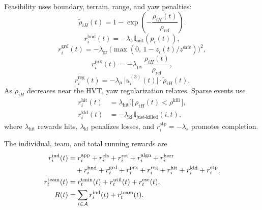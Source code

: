 \documentclass[unbranded]{cja}
\begin{document}
Feasibility uses boundary, terrain, range, and yaw penalties:
\begin{equation}
\widetilde\rho_{iH}(t)
=
1-
\exp\!\left(-\frac{\rho_{iH}(t)}{\rho_{\mathrm{ref}}}\right).
\end{equation}
\begin{equation}
r_i^{\mathrm{bnd}}(t)=-\lambda_b\,\mathbb{I}_{\mathrm{out}}(p_i(t)),
\label{eq:r-bnd}
\end{equation}
\begin{equation}
r_i^{\mathrm{grd}}(t)=-\lambda_{\mathrm{gr}}\,\bigl(\max(0,\,1-z_i(t)/z^{\mathrm{safe}})\bigr)^{2},
\label{eq:r-grd}
\end{equation}
\begin{equation}
r_i^{\mathrm{prx}}(t)=-\lambda_{\mathrm{px}}\,\frac{\rho_{iH}(t)}{\rho_{\mathrm{ref}}},
\label{eq:r-prx}
\end{equation}
\begin{equation}
r_i^{\mathrm{reg}}(t)=-\lambda_{\mu}\,\bigl|u_i^{(3)}(t)\bigr|\cdot \widetilde\rho_{iH}(t).
\label{eq:r-reg}
\end{equation}
As $\widetilde\rho_{iH}$ decreases near the HVT, yaw regularization relaxes. Sparse events use
\begin{equation}
\begin{aligned}
r_i^{\mathrm{hit}}(t)
&=\lambda_{\mathrm{hit}}\mathbb{I}\bigl[\,\rho_{iH}(t)<\rho^{\mathrm{kill}}\,\bigr],\\
r_i^{\mathrm{kld}}(t)
&=-\lambda_{\mathrm{kl}}\,\mathbb{I}_{\text{just-killed}}(i,t),
\end{aligned}
\label{eq:r-event}
\end{equation}
where $\lambda_{\mathrm{hit}}$ rewards hits, $\lambda_{\mathrm{kl}}$ penalizes losses, and $r_i^{\mathrm{stp}}=-\lambda_s$ promotes completion.

The individual, team, and total running rewards are
\begin{align}
r_i^{\mathrm{ind}}(t)
&=r_i^{\mathrm{app}}+r_i^{\mathrm{cls}}+r_i^{\mathrm{ret}}
+r_i^{\mathrm{algn}}+r_i^{\mathrm{herr}}\notag\\
&\quad+r_i^{\mathrm{bnd}}+r_i^{\mathrm{grd}}+r_i^{\mathrm{prx}}+r_i^{\mathrm{reg}}
+r_i^{\mathrm{hit}}+r_i^{\mathrm{kld}}+r_i^{\mathrm{stp}},
\label{eq:r-ind}\\
r_t^{\mathrm{team}}(t)
&=r_t^{\mathrm{tmin}}(t)+r_t^{\mathrm{util}}(t)+r_t^{\mathrm{esc}}(t),\\
R(t)
&=\sum_{i\in\mathcal A}r_i^{\mathrm{ind}}(t)+r_t^{\mathrm{team}}(t).
\label{eq:r-total}
\end{align}
\end{document}
